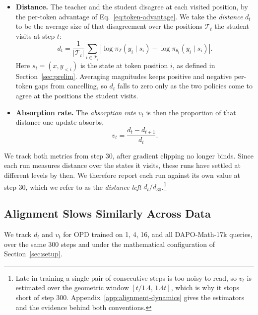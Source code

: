 \begin{itemize}[topsep=2pt, partopsep=0pt, leftmargin=13pt, itemsep=2pt, parsep=0pt]
    \item \textbf{Distance.} The teacher and the student disagree at each visited position, by the per-token advantage of Eq.~\ref{eq:token-advantage}. We take the \emph{distance} \(d_t\) to be the average size of that disagreement over the positions \(\mathcal{T}_t\) the student visits at step \(t\):
    \begin{equation}
        d_t
        =
        \frac{1}{|\mathcal{T}_t|}
        \sum_{i\in\mathcal{T}_t}
        \left|
            \log\pi_T(y_i\mid s_i)-\log\pi_{\theta_t}(y_i\mid s_i)
        \right|.
        \label{eq:distance}
    \end{equation}
    Here \(s_i=(x,y_{<i})\) is the state at token position \(i\), as defined in Section~\ref{sec:prelim}. Averaging magnitudes keeps positive and negative per-token gaps from cancelling, so \(d_t\) falls to zero only as the two policies come to agree at the positions the student visits.
    \item \textbf{Absorption rate.} The \emph{absorption rate} \(v_t\) is then the proportion of that distance one update absorbs,
    \begin{equation}
        v_t = \frac{d_t-d_{t+1}}{d_t}.
        \label{eq:absorption-rate}
    \end{equation}
\end{itemize}
We track both metrics from step 30, after gradient clipping no longer binds. Since each run measures distance over the states it visits, these runs have settled at different levels by then. We therefore report each run against its own value at step 30, which we refer to as the \emph{distance left} \(d_t/d_{30}\).\footnote{Late in training a single pair of consecutive steps is too noisy to read, so \(v_t\) is estimated over the geometric window \([t/1.4,\,1.4t]\), which is why it stops short of step \(300\). Appendix~\ref{app:alignment-dynamics} gives the estimators and the evidence behind both conventions.}

\subsection{Alignment Slows Similarly Across Data}
\label{sec:mech-dynamics}

We track \(d_t\) and \(v_t\) for OPD trained on 1, 4, 16, and all DAPO-Math-17k queries, over the same \(300\) steps and under the mathematical configuration of Section~\ref{sec:setup}.

